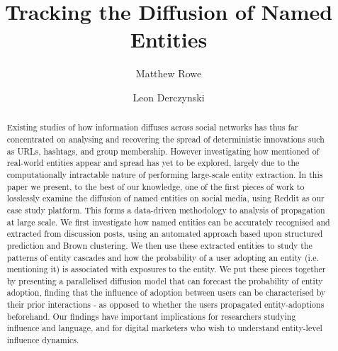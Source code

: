 \documentclass[review]{elsarticle}
\begin{document}
\title{Tracking the Diffusion of Named Entities}


\author[lancs]{Matthew Rowe}
\author[usfd]{Leon Derczynski}



\address[lancs]{School of Computing and Communications, Lancaster University, Lancaster UK}
\address[usfd]{Department of Computer Science, University of Sheffield, Sheffield UK}



\begin{abstract}
Existing studies of how information diffuses across social networks has thus far concentrated on analysing and recovering the spread of deterministic innovations such as URLs, hashtags, and group membership.
However investigating how mentioned of real-world entities appear and spread has yet to be explored, largely due to the computationally intractable nature of performing large-scale entity extraction.
In this paper we present, to the best of our knowledge, one of the first pieces of work to losslessly examine the diffusion of named entities on social media, using Reddit as our case study platform.
This forms a data-driven methodology to analysis of propagation at large scale. %
We first investigate how named entities can be accurately recognised and extracted from discussion posts, using an automated approach based upon structured prediction and Brown clustering.
We then use these extracted entities to study the patterns of entity cascades and how the probability of a user adopting an entity (i.e. mentioning it) is associated with exposures to the entity.
We put these pieces together by presenting a parallelised diffusion model that can forecast the probability of entity adoption, finding that the influence of adoption between users can be characterised by their prior interactions - as opposed to whether the users propagated entity-adoptions beforehand.
Our findings have important implications for researchers studying influence and language, and for digital marketers who wish to understand entity-level influence dynamics.
\end{abstract}

\maketitle
\end{document}
